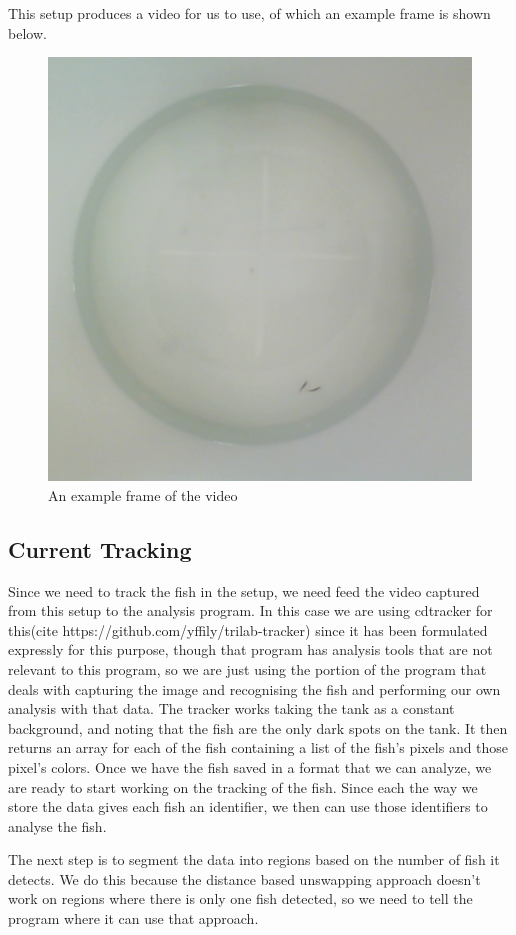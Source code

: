 \documentclass{article}
\begin{document}
This setup produces a video for us to use, of which an example frame is shown below.

\begin{figure}[H]
	\centering
	\includegraphics[width=.5\linewidth]{figures.frame5140}
	\caption{An example frame of the video}
\end{figure}

\subsection{Current Tracking}
Since we need to track the fish in the setup, we need feed the video captured from this setup to the analysis program. In this case we are using cdtracker for this(cite https://github.com/yffily/trilab-tracker) since it has been formulated expressly for this purpose, though that program has analysis tools that are not relevant to this program, so we are just using the portion of the program that deals with capturing the image and recognising the fish and performing our own analysis with that data. The tracker works taking the tank as a constant background, and noting that the fish are the only dark spots on the tank. It then returns an array for each of the fish containing a list of the fish's pixels and those pixel's colors. Once we have the fish saved in a format that we can analyze, we are ready to start working on the tracking of the fish. Since each the way we store the data gives each fish an identifier, we then can use those identifiers to analyse the fish.

The next step is to segment the data into regions based on the number of fish it detects. We do this because the distance based unswapping approach doesn't work on regions where there is only one fish detected, so we need to tell the program where it can use that approach.
\end{document}
